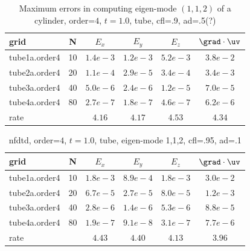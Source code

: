 \begin{table}[hbt]
\begin{center}
\begin{tabular}{|l|c|c|c|c|c|} \hline\hline 
grid  & N &  $E_x$ &  $E_y$ & $E_z$ & $\grad\cdot\uv$\\ \hline 
       tube1a.order4 &    10 &$1.4 e-3$ &$1.2 e-3$ &$5.2 e-3$ &$3.8 e-2$  \\ \hline
       tube2a.order4 &    20 &$1.1 e-4$ &$2.9 e-5$ &$3.4 e-4$ &$3.4 e-3$  \\ \hline
       tube3a.order4 &    40 &$5.0 e-6$ &$2.4 e-6$ &$1.2 e-5$ &$7.0 e-5$  \\ \hline
       tube4a.order4 &    80 &$2.7 e-7$ &$1.8 e-7$ &$4.6 e-7$ &$6.2 e-6$  \\ \hline
    rate            &     &       $4.16$ &       $4.17$ &       $4.53$ &       $4.34$  \\ \hline\hline
\end{tabular}
\caption{Maximum errors in computing 
         eigen-mode $(1,1,2)$ of a cylinder, order=$4$, $t=1.0$, tube,  cfl=.9, ad=.5(?)}\label{table:mx.tube}
\end{center}
\end{table}

\begin{table}[hbt]
\begin{center}
\begin{tabular}{|l|c|c|c|c|c|} \hline\hline 
grid  & N &  $E_x$ &  $E_y$ & $E_z$ & $\grad\cdot\uv$\\ \hline 
       tube1a.order4 &    10 &$1.8 e-3$ &$8.9 e-4$ &$1.8 e-3$ &$3.0 e-2$  \\ \hline
       tube2a.order4 &    20 &$6.7 e-5$ &$2.7 e-5$ &$8.0 e-5$ &$1.2 e-3$  \\ \hline
       tube3a.order4 &    40 &$2.8 e-6$ &$1.4 e-6$ &$5.3 e-6$ &$8.8 e-5$  \\ \hline
       tube4a.order4 &    80 &$1.9 e-7$ &$9.1 e-8$ &$3.1 e-7$ &$7.7 e-6$  \\ \hline
    rate            &     &       $4.43$ &       $4.40$ &       $4.13$ &       $3.96$  \\ \hline\hline
\end{tabular}
\caption{nfdtd, order=$4$, $t=1.0$, tube, eigen-mode 1,1,2, cfl=.95, ad=.1}\label{table:mx.tube}
\end{center}
\end{table}


